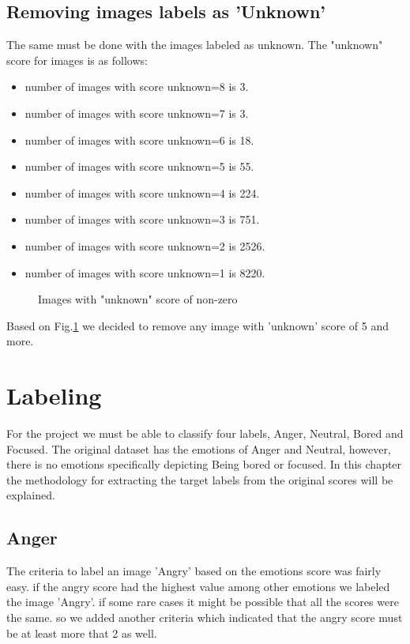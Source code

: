 \documentclass[]{report}
\begin{document}
\section{Removing images labels as 'Unknown'}
The same must be done with the images labeled as unknown. The "unknown" score for images is as follows:
\begin{itemize}
	\item number of images with score unknown=8 is  3.
	\item number of images with score unknown=7 is  3.
	\item number of images with score unknown=6 is  18.
	\item number of images with score unknown=5 is  55.
	\item number of images with score unknown=4 is  224.
	\item number of images with score unknown=3 is  751.
	\item number of images with score unknown=2 is  2526.
	\item number of images with score unknown=1 is  8220.
\end{itemize}

\begin{figure}[h]
	\centering
	\subfloat[Images with unknown=6]{{ }}
	\qquad
	\subfloat[Images with unknown=5]{{ }}
	\caption{Images with "unknown" score of non-zero}
	\label{fig:uk}
\end{figure}

Based on Fig.\ref{fig:uk} we decided to remove any image with 'unknown' score of 5 and more.

\chapter{Labeling}
For the project we must be able to classify four labels, Anger, Neutral, Bored and Focused. The original dataset has the emotions of Anger and Neutral, however, there is no emotions specifically depicting Being bored or focused. In this chapter the methodology for extracting the target labels from the original scores will be explained.
\section{Anger}
The criteria to label an image 'Angry' based on the emotions score was fairly easy. if the angry score had the highest value among other emotions we labeled the image 'Angry'.
if some rare cases it might be possible that all the scores were the same. so we added another criteria which indicated that the angry score must be at least more that 2 as well.
\end{document}
